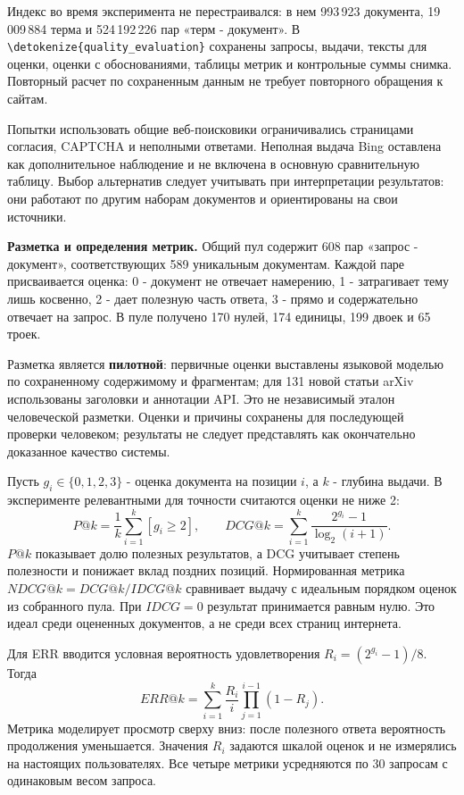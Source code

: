 \documentclass[pdf,unicode,12pt,a4paper,oneside,fleqn]{article}
\newcommand{\partlabel}[1]{\par\Needspace{4\baselineskip}\medskip\textbf{#1.}\quad}
\DeclareRobustCommand{\code}[1]{\expandafter\nolinkurl\expandafter{\detokenize{#1}}}
\begin{document}
Индекс во время эксперимента не перестраивался: в нем 993\,923 документа,
19\,009\,884 терма и 524\,192\,226 пар «терм - документ». В
\code{quality_evaluation} сохранены запросы, выдачи, тексты для оценки,
оценки с обоснованиями, таблицы метрик и контрольные суммы снимка. Повторный
расчет по сохраненным данным не требует повторного обращения к сайтам.

Попытки использовать общие веб-поисковики ограничивались страницами согласия,
CAPTCHA и неполными ответами. Неполная выдача Bing оставлена как дополнительное
наблюдение и не включена в основную сравнительную таблицу. Выбор альтернатив
следует учитывать при интерпретации результатов: они работают по другим
наборам документов и ориентированы на свои источники.

\partlabel{Разметка и определения метрик}
Общий пул содержит 608 пар «запрос - документ», соответствующих 589 уникальным
документам. Каждой паре присваивается оценка: 0 - документ не отвечает
намерению, 1 - затрагивает тему лишь косвенно, 2 - дает полезную часть ответа,
3 - прямо и содержательно отвечает на запрос. В пуле получено 170 нулей,
174 единицы, 199 двоек и 65 троек.

Разметка является \textbf{пилотной}: первичные оценки выставлены языковой
моделью по сохраненному содержимому и фрагментам; для 131 новой статьи arXiv
использованы заголовки и аннотации API. Это не независимый эталон
человеческой разметки. Оценки и причины сохранены для последующей проверки
человеком; результаты не следует представлять как окончательно доказанное
качество системы.

Пусть $g_i\in\{0,1,2,3\}$ - оценка документа на позиции $i$, а $k$ - глубина
выдачи. В эксперименте релевантными для точности считаются оценки не ниже 2:
\[
 P@k=\frac{1}{k}\sum_{i=1}^k [g_i\geq2],\qquad
 DCG@k=\sum_{i=1}^k\frac{2^{g_i}-1}{\log_2(i+1)}.
\]
$P@k$ показывает долю полезных результатов, а DCG учитывает степень
полезности и понижает вклад поздних позиций. Нормированная метрика
$NDCG@k=DCG@k/IDCG@k$ сравнивает выдачу с идеальным порядком оценок из
собранного пула. При $IDCG=0$ результат принимается равным нулю. Это идеал
среди оцененных документов, а не среди всех страниц интернета.

Для ERR вводится условная вероятность удовлетворения
$R_i=(2^{g_i}-1)/8$. Тогда
\[
 ERR@k=\sum_{i=1}^k\frac{R_i}{i}\prod_{j=1}^{i-1}(1-R_j).
\]
Метрика моделирует просмотр сверху вниз: после полезного ответа вероятность
продолжения уменьшается. Значения $R_i$ задаются шкалой оценок и не измерялись
на настоящих пользователях. Все четыре метрики усредняются по 30 запросам
с одинаковым весом запроса.
\end{document}
